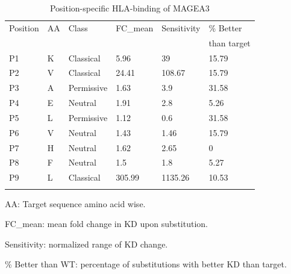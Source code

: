 \documentclass[unnumsec,webpdf,contemporary,large]{oup-authoring-template}%
\theoremstyle{thmstyleone}%
\theoremstyle{thmstyletwo}%
\theoremstyle{thmstylethree}%
\begin{document}
        \begin{table}[t]
        \centering
        \begin{minipage}{0.7\textwidth}
            \caption{Position-specific HLA-binding of MAGEA3\label{tab:xscan}}%
            \begin{tabular}{@{}llllll@{}}
                \toprule
                Position & AA & Class & FC\_mean & Sensitivity & \% Better \\
                 &  &  &  &  & than target \\
                \midrule
                P1 & K & Classical & 5.96 & 39 & 15.79 \\
                P2 & V & Classical & 24.41 & 108.67 & 15.79 \\
                P3 & A & Permissive & 1.63 & 3.9 & 31.58 \\
                P4 & E & Neutral & 1.91 & 2.8 & 5.26 \\
                P5 & L & Permissive & 1.12 & 0.6 & 31.58 \\
                P6 & V & Neutral & 1.43 & 1.46 & 15.79 \\
                P7 & H & Neutral & 1.62 & 2.65 & 0 \\
                P8 & F & Neutral & 1.5 & 1.8 & 5.27 \\
                P9 & L & Classical & 305.99 & 1135.26 & 10.53 \\
                \botrule
            \end{tabular}
            \begin{tablenotes}
                \item AA: Target sequence amino acid wise. 
                \item FC\_mean: mean fold change in KD upon substitution.
                \item Sensitivity: normalized range of KD change.
                \item \% Better than WT: percentage of substitutions with better KD than target.
            \end{tablenotes}
        \end{minipage}
        \end{table}
      
\end{document}
